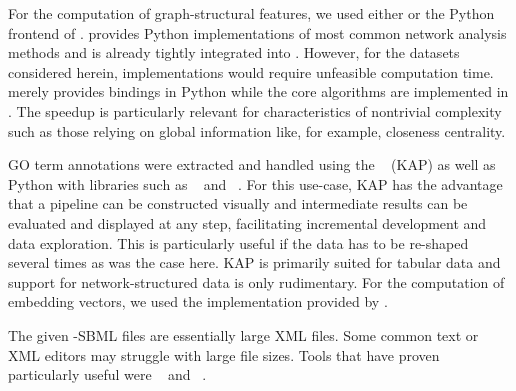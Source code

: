 \documentclass[
	fontsize=10pt, %
	twoside=false, %
	secnumdepth=1, %
  toc=indentunnumbered %
]{kaobook}
\begin{document}
For the computation of graph-structural features, we used either
 \cite{hagberg_ExploringNetworkStructure_2008} or the Python
frontend of  \cite{csardi_IgraphSoftwarePackage_}.
 provides Python implementations of most common network
analysis methods and is already tightly integrated into .
However, for the datasets considered herein,  implementations
would require unfeasible computation time.  merely provides
bindings in Python while the core algorithms are implemented in . The
speedup is particularly relevant for characteristics of nontrivial complexity
such as those relying on global information like, for example, closeness
centrality.

GO term annotations were extracted and handled using the ~\cite{gesellschaftfurklassifikation_DataAnalysisMachine_2008} (KAP)
as well as Python with libraries such as
~\cite{reback_PandasdevPandasPandas_2021} and
~\cite{harris_ArrayProgrammingNumPy_2020}. For this use-case,
KAP has the advantage that a pipeline can be constructed visually and
intermediate results can be evaluated and displayed at any step, facilitating
incremental development and data exploration. This is particularly useful if the
data has to be re-shaped several times as was the case here. KAP is primarily
suited for tabular data and support for network-structured data is only
rudimentary. For the computation of embedding vectors, we used the
 implementation provided by . 

The given -SBML files are essentially large XML files.
Some common text or XML editors may struggle with large file sizes. Tools that
have proven particularly useful were
~\cite{_XmlexplorerWindows_2021} and ~\cite{_GNUEmacsGNU_}.
\end{document}
